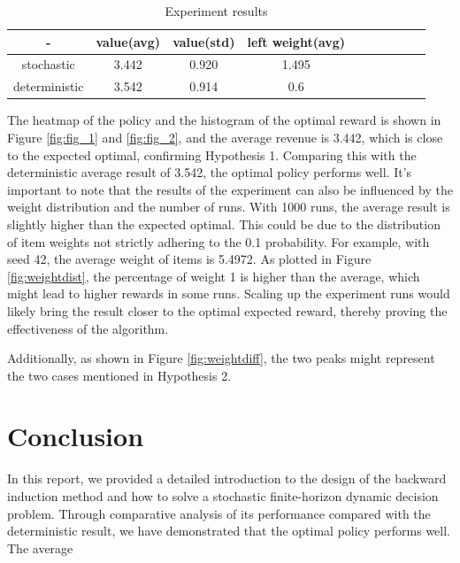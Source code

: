 \begin{table}
    \centering
    \caption{Experiment results}
    \label{tab:my_label}
    \begin{tabular}{cc@{}cc @{}cc @{} cc@{}cc}
     \hline %
        - & value(avg) & value(std) & left weight(avg) \\ \hline
        stochastic & 3.442 & 0.920 & 1.495\\
        deterministic & 3.542 & 0.914& 0.6\\
        \hline
    \end{tabular}
\end{table}

The heatmap of the policy and the histogram of the optimal reward is shown in Figure \ref{fig:fig_1} and \ref{fig:fig_2}, and the average revenue is 3.442, which is close to the expected optimal, confirming Hypothesis 1. Comparing this with the deterministic average result of 3.542, the optimal policy performs well. It's important to note that the results of the experiment can also be influenced by the weight distribution and the number of runs. With 1000 runs, the average result is slightly higher than the expected optimal. This could be due to the distribution of item weights not strictly adhering to the 0.1 probability. For example, with seed 42, the average weight of items is 5.4972. As plotted in Figure \ref{fig:weightdist}, the percentage of weight 1 is higher than the average, which might lead to higher rewards in some runs. Scaling up the experiment runs would likely bring the result closer to the optimal expected reward, thereby proving the effectiveness of the algorithm.

Additionally, as shown in Figure \ref{fig:weightdiff}, the two peaks might represent the two cases mentioned in Hypothesis 2.

\section{Conclusion}
In this report, we provided a detailed introduction to the design of the backward induction method and how to solve a stochastic finite-horizon dynamic decision problem. Through comparative analysis of its performance compared with the deterministic result, we have demonstrated that the optimal policy performs well. The average

